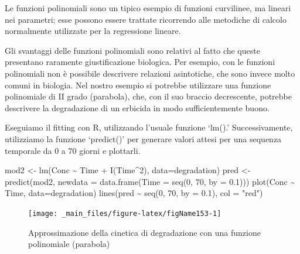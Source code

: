 \documentclass[a4paper,12pt,oneside]{book}
\newenvironment{Shaded}{\begin{snugshade}}{\end{snugshade}}
\newcommand{\DecValTok}[1]{#1}
\newcommand{\FloatTok}[1]{#1}
\newcommand{\SpecialCharTok}[1]{#1}
\newcommand{\StringTok}[1]{#1}
\newcommand{\OtherTok}[1]{#1}
\newcommand{\FunctionTok}[1]{#1}
\newcommand{\AttributeTok}[1]{#1}
\newcommand{\NormalTok}[1]{#1}
\begin{document}
Le funzioni polinomiali sono un tipico esempio di funzioni curvilinee, ma lineari nei parametri; esse possono essere trattate ricorrendo alle metodiche di calcolo normalmente utilizzate per la regressione lineare.

Gli svantaggi delle funzioni polinomiali sono relativi al fatto che queste presentano raramente giustificazione biologica. Per esempio, con le funzioni polinomiali non è possibile descrivere relazioni asintotiche, che sono invece molto comuni in biologia. Nel nostro esempio si potrebbe utilizzare una funzione polinomiale di II grado (parabola), che, con il suo braccio decrescente, potrebbe descrivere la degradazione di un erbicida in modo sufficientemente buono.

Eseguiamo il fitting con R, utilizzando l'usuale funzione `lm().' Successivamente, utilizziamo la funzione `predict()' per generare valori attesi per una sequenza temporale da 0 a 70 giorni e plottarli.

\begin{Shaded}
\begin{Highlighting}[]
\NormalTok{mod2 }\OtherTok{\textless{}{-}} \FunctionTok{lm}\NormalTok{(Conc }\SpecialCharTok{\textasciitilde{}}\NormalTok{ Time }\SpecialCharTok{+} \FunctionTok{I}\NormalTok{(Time}\SpecialCharTok{\^{}}\DecValTok{2}\NormalTok{), }\AttributeTok{data=}\NormalTok{degradation)}
\NormalTok{pred }\OtherTok{\textless{}{-}} \FunctionTok{predict}\NormalTok{(mod2, }\AttributeTok{newdata =} \FunctionTok{data.frame}\NormalTok{(}\AttributeTok{Time =} \FunctionTok{seq}\NormalTok{(}\DecValTok{0}\NormalTok{, }\DecValTok{70}\NormalTok{, }\AttributeTok{by =} \FloatTok{0.1}\NormalTok{)))}
\FunctionTok{plot}\NormalTok{(Conc }\SpecialCharTok{\textasciitilde{}}\NormalTok{ Time, }\AttributeTok{data=}\NormalTok{degradation)}
\FunctionTok{lines}\NormalTok{(pred }\SpecialCharTok{\textasciitilde{}} \FunctionTok{seq}\NormalTok{(}\DecValTok{0}\NormalTok{, }\DecValTok{70}\NormalTok{, }\AttributeTok{by =} \FloatTok{0.1}\NormalTok{), }\AttributeTok{col =} \StringTok{"red"}\NormalTok{)}
\end{Highlighting}
\end{Shaded}

\begin{figure}

{\centering \texttt{[image: \_main\_files/figure-latex/figName153-1]} 

}

\caption{Approssimazione della cinetica di degradazione con una funzione polinomiale (parabola)}\label{fig:figName153}
\end{figure}
\end{document}
